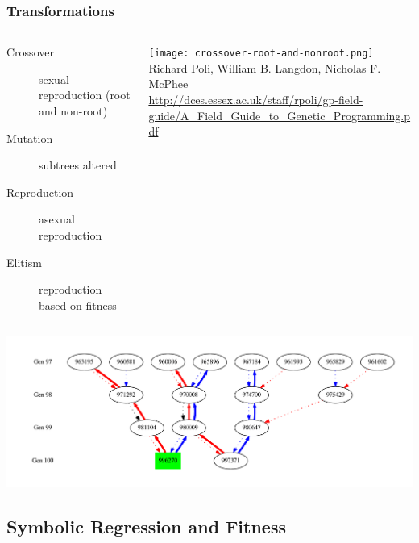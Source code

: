 \documentclass{beamer}
\begin{document}
\begin{frame}
\frametitle{Transformations}
\begin{columns}
\begin{column}{0.55\textwidth}
{\footnotesize
		\begin{description}
		\item[Crossover] sexual reproduction (root and non-root)
		\item[Mutation] subtrees altered
		\item[Reproduction] asexual reproduction
		\item[Elitism] reproduction based on fitness
		\end{description}
}
\end{column}
\begin{column}{0.45\textwidth}
\texttt{[image: crossover-root-and-nonroot.png]} \\
\tiny{Richard Poli, William B. Langdon, Nicholas F. McPhee \\ \url{http://dces.essex.ac.uk/staff/rpoli/gp-field-guide/A_Field_Guide_to_Genetic_Programming.pdf}}
\end{column}
\end{columns}
\begin{center}
\includegraphics[width=.95\textwidth]{XO_path_example.pdf}
\end{center}
\end{frame}

\subsection{Symbolic Regression and Fitness}
\end{document}
